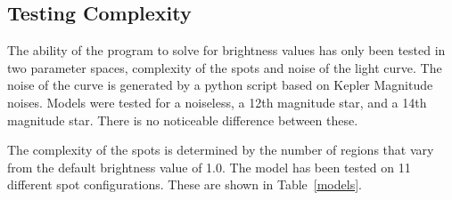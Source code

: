 

\subsection{Testing Complexity \label{complexity}}
The ability of the program to solve for brightness values has only been tested in two parameter spaces, complexity of the spots and noise of the light curve. The noise of the curve is generated by a python script based on Kepler Magnitude noises. Models were tested for a noiseless, a 12th magnitude star, and a 14th magnitude star. There is no noticeable difference between these.

The complexity of the spots is determined by the number of regions that vary from the default brightness value of 1.0. The model has been tested on 11 different spot configurations. These are shown in Table~\ref{models}.

